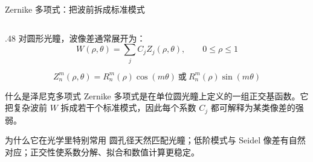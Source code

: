 \begin{frame}{Zernike 多项式：把波前拆成标准模式}
\label{1.8}
    \begin{columns}[T]
        \begin{column}{.48\textwidth}
            \scriptsize
            对圆形光瞳，波像差通常展开为：
            \begin{equation}
                W(\rho,\theta)=\sum_j C_j Z_j(\rho,\theta),
                \qquad 0\le \rho \le 1
                \label{eq:zernike_main}
            \end{equation}

            \begin{equation}
                Z_n^m(\rho,\theta)
                =R_n^m(\rho)\cos(m\theta)
                \ \text{或}\
                R_n^m(\rho)\sin(m\theta)
                \label{eq:zernike_nm_main}
            \end{equation}

            \begin{block}{什么是泽尼克多项式}
                Zernike 多项式是在\alert{单位圆光瞳}上定义的一组正交基函数。它把复杂波前 $W$ 拆成若干个标准模式，因此每个系数 $C_j$ 都可解释为某类像差的强弱。
            \end{block}

            \vspace{-2pt}
            \begin{block}{为什么它在光学里特别常用}
                圆孔径天然匹配光瞳；低阶模式与 Seidel 像差有自然对应；正交性使系数分解、拟合和数值计算更稳定。
            \end{block}


\end{column}
\end{columns}
\end{frame}
